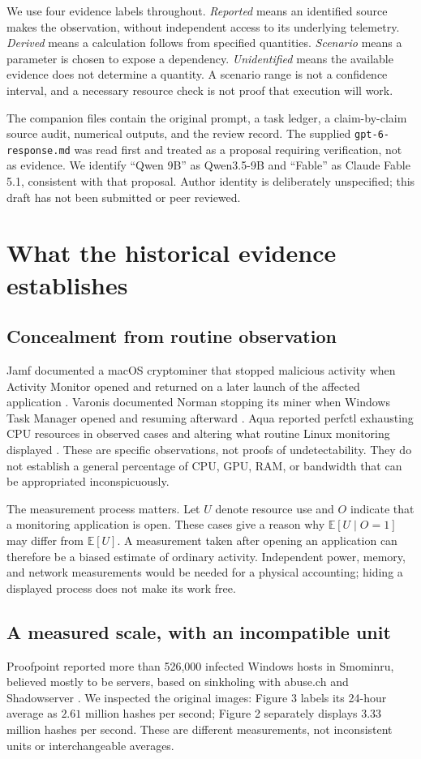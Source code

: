 \documentclass[11pt]{article}
\newcommand{\E}{\mathbb E}
\begin{document}
We use four evidence labels throughout. \emph{Reported} means an identified source makes the observation, without independent access to its underlying telemetry. \emph{Derived} means a calculation follows from specified quantities. \emph{Scenario} means a parameter is chosen to expose a dependency. \emph{Unidentified} means the available evidence does not determine a quantity. A scenario range is not a confidence interval, and a necessary resource check is not proof that execution will work.

The companion files contain the original prompt, a task ledger, a claim-by-claim source audit, numerical outputs, and the review record. The supplied \texttt{gpt-6-response.md} was read first and treated as a proposal requiring verification, not as evidence. We identify ``Qwen 9B'' as Qwen3.5-9B and ``Fable'' as Claude Fable 5.1, consistent with that proposal. Author identity is deliberately unspecified; this draft has not been submitted or peer reviewed.

\section{What the historical evidence establishes}
\subsection{Concealment from routine observation}
Jamf documented a macOS cryptominer that stopped malicious activity when Activity Monitor opened and returned on a later launch of the affected application \citep{jamf}. Varonis documented Norman stopping its miner when Windows Task Manager opened and resuming afterward \citep{norman}. Aqua reported perfctl exhausting CPU resources in observed cases and altering what routine Linux monitoring displayed \citep{perfctl}. These are specific observations, not proofs of undetectability. They do not establish a general percentage of CPU, GPU, RAM, or bandwidth that can be appropriated inconspicuously.

The measurement process matters. Let $U$ denote resource use and $O$ indicate that a monitoring application is open. These cases give a reason why $\E[U\mid O=1]$ may differ from $\E[U]$. A measurement taken after opening an application can therefore be a biased estimate of ordinary activity. Independent power, memory, and network measurements would be needed for a physical accounting; hiding a displayed process does not make its work free.

\subsection{A measured scale, with an incompatible unit}
Proofpoint reported more than 526,000 infected Windows hosts in Smominru, believed mostly to be servers, based on sinkholing with abuse.ch and Shadowserver \citep{smominru}. We inspected the original images: Figure 3 labels its 24-hour average as $2.61$ million hashes per second; Figure 2 separately displays $3.33$ million hashes per second. These are different measurements, not inconsistent units or interchangeable averages.
\end{document}
